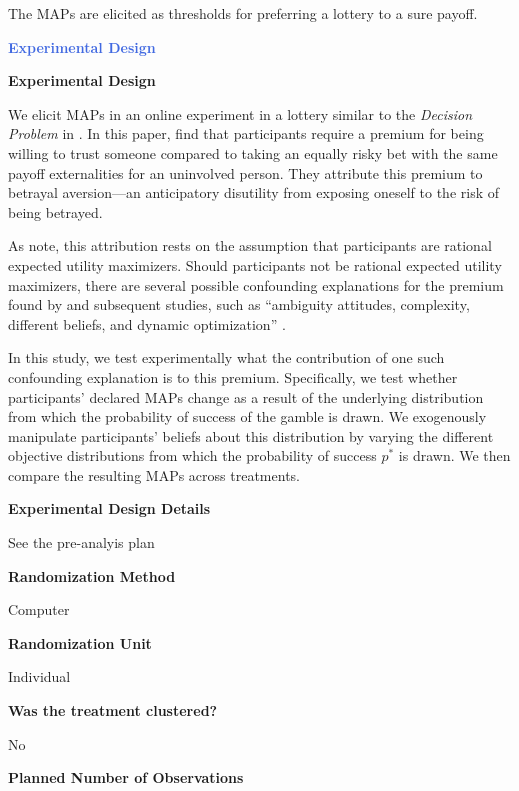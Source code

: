 The MAPs are elicited as thresholds for preferring a lottery to a sure payoff. 



\large \noindent \textcolor{RoyalBlue}{\textbf{Experimental Design}}

\normalsize \noindent \textcolor{NavyBlue}{\textbf{Experimental Design}}

We elicit MAPs in an online experiment in a lottery similar to the \textit{Decision Problem} in \cite{Bohnet2004}.
In this paper, \cite{Bohnet2004} find that participants require a premium for being willing to trust someone compared to taking an equally risky bet with the same payoff externalities for an uninvolved person.
They attribute this premium to betrayal aversion---an anticipatory disutility from exposing oneself to the risk of being betrayed.

As \cite{Li2020a} note, this attribution rests on the assumption that participants are rational expected utility maximizers.
Should participants not be rational expected utility maximizers, there are several possible confounding explanations for the premium found by \cite{Bohnet2004} and subsequent studies, such as ``ambiguity attitudes, complexity, different beliefs, and dynamic optimization'' \citep[p.~275]{Li2020a}.

In this study, we test experimentally what the contribution of one such confounding explanation is to this premium.
Specifically, we test whether participants' declared MAPs change as a result of the underlying distribution from which the probability of success of the gamble is drawn.
We exogenously manipulate participants' beliefs about this distribution by varying the different objective distributions from which the probability of success $p^*$ is drawn.
We then compare the resulting MAPs across treatments.

\noindent \textcolor{NavyBlue}{\textbf{Experimental Design Details}}

See the pre-analyis plan

\noindent \textcolor{NavyBlue}{\textbf{Randomization Method}}

Computer

\noindent \textcolor{NavyBlue}{\textbf{Randomization Unit}}

Individual

\noindent \textcolor{NavyBlue}{\textbf{Was the treatment clustered?}}

No

\noindent \textcolor{NavyBlue}{\textbf{Planned Number of Observations}}

